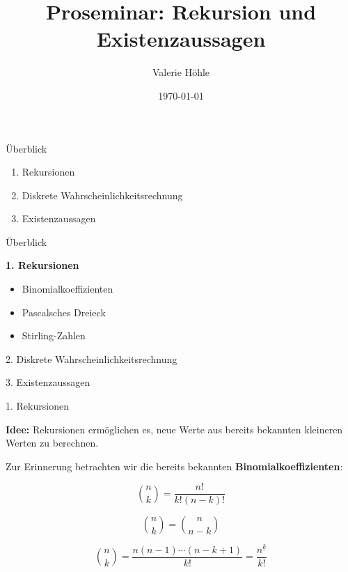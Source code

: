 \documentclass{beamer}
\title{Proseminar: Rekursion und Existenzaussagen}
\author{Valerie Höhle}
\date{\today}
\begin{document}
\begin{frame}
    \titlepage
\end{frame}

\begin{frame}{Überblick}
\begin{enumerate}
    \item Rekursionen
    \item Diskrete Wahrscheinlichkeitsrechnung
    \item Existenzaussagen
\end{enumerate}
\end{frame}

\begin{frame}{Überblick}

\textbf{1. Rekursionen}
\begin{itemize}
    \item Binomialkoeffizienten
    \item Pascalsches Dreieck
    \item Stirling-Zahlen
\end{itemize}

\vspace{0.5cm}

2. Diskrete Wahrscheinlichkeitsrechnung

\vspace{0.2cm}

3. Existenzaussagen

\end{frame}


\begin{frame}{1. Rekursionen}

\textbf{Idee:}
Rekursionen ermöglichen es, neue Werte aus bereits bekannten kleineren Werten zu berechnen.

\vspace{0.4cm}

Zur Erinnerung betrachten wir die bereits bekannten
\textbf{Binomialkoeffizienten}:

\[
\binom{n}{k}
=
\frac{n!}{k!(n-k)!}
\]

\[
\binom{n}{k}
=
\binom{n}{n-k}
\]

\[
\binom{n}{k}
=
\frac{n(n-1)\cdots(n-k+1)}{k!}
=
\frac{n^{\underline{k}}}{k!}
\]

\end{frame}
\end{document}
